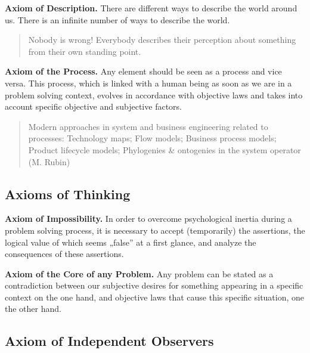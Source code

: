 \documentclass[11pt,a4paper]{article}
\begin{document}
\textbf{Axiom of Description.} There are different ways to describe the world
around us.  There is an infinite number of ways to describe the world.
\begin{quote}
  Nobody is wrong! Everybody describes their perception about something from
  their own standing point.
\end{quote}

\textbf{Axiom of the Process.} Any element should be seen as a process and
vice versa.  This process, which is linked with a human being as soon as we
are in a problem solving context, evolves in accordance with objective laws
and takes into account specific objective and subjective factors.
\begin{quote}
  Modern approaches in system and business engineering related to processes:
  Technology maps; Flow models; Business process models; Product lifecycle
  models; Phylogenies \& ontogenies in the system operator (M. Rubin)
\end{quote}

\subsection{Axioms of Thinking}

\textbf{Axiom of Impossibility.} In order to overcome psychological inertia
during a problem solving process, it is necessary to accept (temporarily) the
assertions, the logical value of which seems „false” at a first glance, and
analyze the consequences of these assertions.

\textbf{Axiom of the Core of any Problem.} Any problem can be stated as a
contradiction between our subjective desires for something appearing in a
specific context on the one hand, and objective laws that cause this specific
situation, one the other hand.

\subsection{Axiom of Independent Observers}
\end{document}
